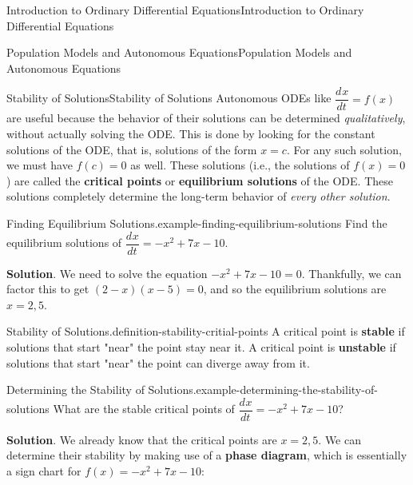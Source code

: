 \documentclass[10pt,]{book}
\newcommand{\terminology}[1]{\textbf{#1}}
\numberwithin{equation}{section}
\newcommand{\dv}[3][]{\dfrac{d^{#1} #2}{d #3^{#1}}}
\begin{document}
\begin{chapterptx}{Introduction to Ordinary Differential Equations}{}{Introduction to Ordinary Differential Equations}{}{}
\begin{sectionptx}{Population Models and Autonomous Equations}{}{Population Models and Autonomous Equations}{}{}
\begin{subsectionptx}{Stability of Solutions}{}{Stability of Solutions}{}{}
Autonomous ODEs like \(\dv{x}{t} = f(x)\) are useful because the behavior of their solutions can be determined \emph{qualitatively}, without actually solving the ODE. This is done by looking for the constant solutions of the ODE, that is, solutions of the form \(x = c\). For any such solution, we must have \(f(c) = 0\) as well. These solutions (i.e., the solutions of \(f(x) = 0\)) are called the \terminology{critical points} or \terminology{equilibrium solutions} of the ODE. These solutions completely determine the long-term behavior of \emph{every other solution}.%
\begin{example}{Finding Equilibrium Solutions.}{example-finding-equilibrium-solutions}%
\hypertarget{p-122}{}%
Find the equilibrium solutions of \(\dv{x}{t} = -x^{2} + 7x - 10\).%
\par\smallskip%
\noindent\textbf{Solution}.\hypertarget{solution-20}{}\quad%
\hypertarget{p-123}{}%
We need to solve the equation \(-x^{2} + 7x - 10 = 0\). Thankfully, we can factor this to get \((2-x)(x-5) = 0\), and so the equilibrium solutions are \(x = 2,5\).%
\end{example}
\begin{definition}{Stability of Solutions.}{definition-stability-critial-points}%
\hypertarget{p-124}{}%
A critical point is \terminology{stable} if solutions that start "near" the point stay near it. A critical point is \terminology{unstable} if solutions that start "near" the point can diverge away from it.%
\end{definition}
\begin{example}{Determining the Stability of Solutions.}{example-determining-the-stability-of-solutions}%
\hypertarget{p-125}{}%
What are the stable critical points of \(\dv{x}{t} = -x^{2} + 7x - 10\)?%
\par\smallskip%
\noindent\textbf{Solution}.\hypertarget{solution-21}{}\quad%
\hypertarget{p-126}{}%
We already know that the critical points are \(x = 2, 5\). We can determine their stability by making use of a \terminology{phase diagram}, which is essentially a sign chart for \(f(x) = -x^{2} + 7x - 10\):%
\begin{figure}
\centering
{
}
\end{figure}
\end{example}
\end{subsectionptx}
\end{sectionptx}
\end{chapterptx}
\end{document}
